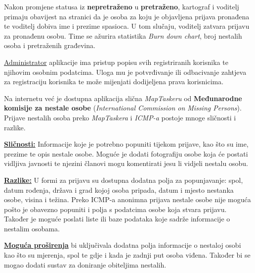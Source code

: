 			Nakon promjene statusa iz \textbf{nepretraženo} u \textbf{pretraženo}, kartograf i voditelj primaju obavijest na stranici da je osoba za koju je objavljena prijava pronađena te voditelj dobiva ime i prezime spasioca. U tom slučaju, voditelj zatvara prijavu za pronađenu osobu. Time se ažurira statistika \textit{Burn down chart}, broj nestalih osoba i pretraženih građevina. 
			
			\underline{Administrator} aplikacije ima pristup popisu svih registriranih korisnika te njihovim osobnim podatcima. Uloga mu je potvrđivanje ili odbacivanje zahtjeva za registraciju korisnika te može mijenjati dodijeljena prava korisnicima.
			

            Na internetu već je dostupna aplikacija slična \textit{MapTaskeru} od \textbf{Međunarodne komisije za nestale osobe} (\textit{International Commission on Missing Persons}). Prijave nestalih osoba preko \textit{MapTaskera} i \textit{ICMP-a} postoje mnoge sličnosti i razlike. 

            \underline{\textbf{Sličnosti:}} Informacije koje je potrebno popuniti tijekom prijave, kao što su ime, prezime te opis nestale osobe. Moguće je dodati fotografiju osobe koja će postati vidljiva javnosti te njezini članovi mogu komentirati jesu li vidjeli nestalu osobu.

            \underline{\textbf{Razlike:}} U formi za prijavu su dostupna dodatna polja za popunjavanje: spol, datum rođenja, država i grad kojoj osoba pripada, datum i mjesto nestanka osobe, visina i težina. Preko ICMP-a anonimna prijava nestale osobe nije moguća pošto je obavezno popuniti i polja s podatcima osobe koja stvara prijavu. Također je moguće poslati liste ili baze podataka koje sadrže informacije o nestalim osobama.


            \underline{\textbf{Moguća proširenja}} bi uključivala dodatna polja informacije o nestaloj osobi kao što su mjerenja, spol te gdje i kada je zadnji put osoba viđena. Također bi se mogao dodati sustav za doniranje obiteljima nestalih.

